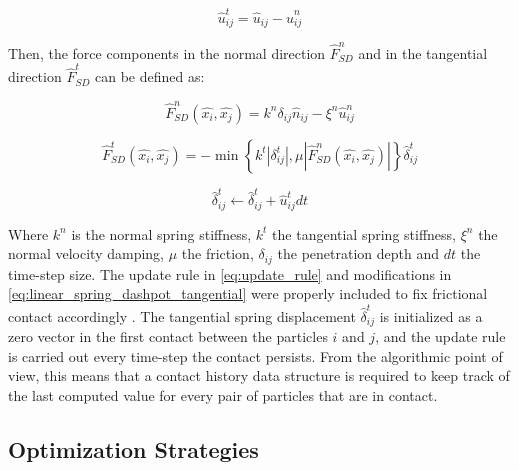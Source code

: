 \documentclass[preprint,12pt]{elsarticle}
\begin{document}
\begin{equation}
    \hat{u}_{ij}^{t} = \hat{u}_{ij} - \hat{u}_{ij}^{n}
    \label{eq:relative_contact_velocity_t}
\end{equation}

Then, the force components in the normal direction $\hat{F}_{SD}^{n}$ and in the tangential direction $\hat{F}_{SD}^{t}$ can be defined as:

\begin{equation}
    \hat{F}_{SD}^{n}(\hat{x_i}, \hat{x_j}) = k^{n}\delta_{ij}\hat{n}_{ij} - \xi^{n}\hat{u}_{ij}^{n}
    \label{eq:linear_spring_dashpot_normal}
\end{equation}

\begin{equation}
    \hat{F}_{SD}^{t}(\hat{x_i}, \hat{x_j}) = -\min \left\{ k^{t}\left| \delta^{t}_{ij} \right|,\mu\left|\hat{F}_{SD}^{n}(\hat{x_i}, \hat{x_j}) \right| \right\} \hat{\delta}^{t}_{ij}
    \label{eq:linear_spring_dashpot_tangential}
\end{equation}

\begin{equation}
    \hat{\delta}^{t}_{ij} \gets \hat{\delta}^{t}_{ij} + \hat{u}_{ij}^{t}dt
    \label{eq:update_rule}
\end{equation}

Where $k^{n}$ is the normal spring stiffness, $k^{t}$ the tangential spring stiffness, $\xi^{n}$ the normal velocity damping, $\mu$ the friction, $\delta_{ij}$ the penetration depth and $dt$ the time-step size.
The update rule in \autoref{eq:update_rule} and modifications in \autoref{eq:linear_spring_dashpot_tangential} were properly included to fix frictional contact accordingly \cite{dem1,dem2}.
The tangential spring displacement $\hat{\delta}^{t}_{ij}$ is initialized as a zero vector in the first contact between the particles $i$ and $j$, and the update rule is carried out every time-step the contact persists.
From the algorithmic point of view, this means that a contact history data structure is required to keep track of the last computed value for every pair of particles that are in contact.

\subsection{Optimization Strategies}
\label{sec:opts}
\end{document}
